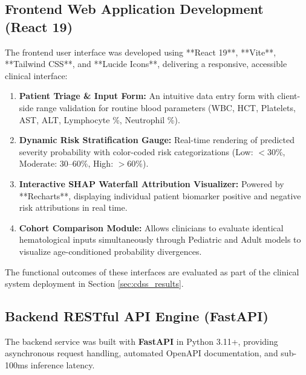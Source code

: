 \documentclass[12pt, a4paper]{report}
\begin{document}
\subsection{Frontend Web Application Development (React 19)}
The frontend user interface was developed using **React 19**, **Vite**, **Tailwind CSS**, and **Lucide Icons**, delivering a responsive, accessible clinical interface:
\begin{enumerate}
    \item \textbf{Patient Triage \& Input Form:} An intuitive data entry form with client-side range validation for routine blood parameters (WBC, HCT, Platelets, AST, ALT, Lymphocyte \%, Neutrophil \%).
    \item \textbf{Dynamic Risk Stratification Gauge:} Real-time rendering of predicted severity probability with color-coded risk categorizations (Low: $<30\%$, Moderate: $30\text{--}60\%$, High: $>60\%$).
    \item \textbf{Interactive SHAP Waterfall Attribution Visualizer:} Powered by **Recharts**, displaying individual patient biomarker positive and negative risk attributions in real time.
    \item \textbf{Cohort Comparison Module:} Allows clinicians to evaluate identical hematological inputs simultaneously through Pediatric and Adult models to visualize age-conditioned probability divergences.
\end{enumerate}

The functional outcomes of these interfaces are evaluated as part of the clinical system deployment in Section \ref{sec:cdss_results}.

\subsection{Backend RESTful API Engine (FastAPI)}
The backend service was built with \textbf{FastAPI} in Python 3.11+, providing asynchronous request handling, automated OpenAPI documentation, and sub-100ms inference latency.
\end{document}

